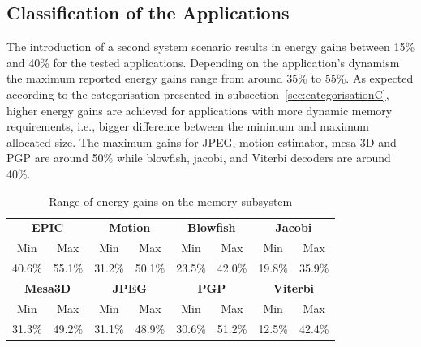 \subsection{Classification of the Applications}

The introduction of a second system scenario results in energy gains between 15\% and  40\%  for the tested applications. 
Depending on the application's dynamism the maximum reported energy gains range from around 35\% to 55\%. 
As expected according to the categorisation presented in subsection~\ref{sec:categorisationC}, higher energy gains are achieved for applications with more dynamic memory requirements, i.e., bigger difference between the minimum and maximum allocated size. 
The maximum gains for JPEG, motion estimator, mesa 3D and PGP are around 50\% while blowfish, jacobi, and Viterbi decoders are around 40\%.

\begin{center}
	\begin{table}
	\caption{Range of energy gains on the memory subsystem}
	\label{tab:ranges}
	{
	\begin{tabular}{|c|c|c|c|c|c|c|c|}
		\hline
		\multicolumn{2}{|c|}{\textbf{EPIC}} &
		\multicolumn{2}{c|}{\textbf{Motion}} &
		\multicolumn{2}{c|}{\textbf{Blowfish}} &
		\multicolumn{2}{c|}{\textbf{Jacobi}}
		\\ 
		\cline{1-8}
		Min & Max & Min & Max & Min & Max & 
		Min & Max \\ 
		\hline 
		40.6\% & 55.1\% & 31.2\% & 50.1\% & 23.5\% & 42.0\% & 
		19.8\% & 35.9\% \\ 
		\hline 

		\multicolumn{2}{|c|}{\textbf{Mesa3D}} &
		\multicolumn{2}{c|}{\textbf{JPEG}} &
		\multicolumn{2}{c|}{\textbf{PGP}} &
		\multicolumn{2}{c|}{\textbf{Viterbi}} \\ 
		\cline{1-8}
		Min & Max & Min & Max & Min & Max & 
		Min & Max \\ 
		\hline 
		31.3\% & 49.2\% & 31.1\% & 48.9\% & 
		30.6\% & 51.2\% & 12.5\% & 42.4\% \\ 
		\hline
		
	\end{tabular}}
	\end{table}
\end{center}

